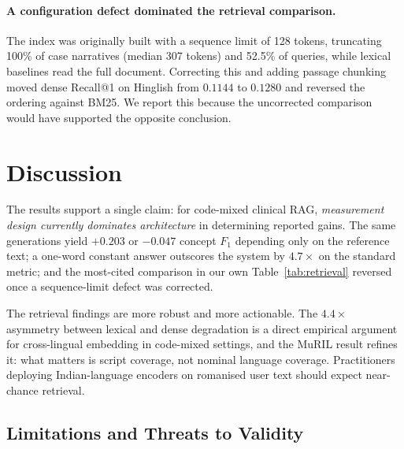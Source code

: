 \documentclass[pdflatex,sn-mathphys-num]{sn-jnl}
\theoremstyle{thmstyleone}
\theoremstyle{thmstyletwo}
\theoremstyle{thmstylethree}
\begin{document}
\paragraph{A configuration defect dominated the retrieval comparison.} The index was
originally built with a sequence limit of 128 tokens, truncating 100\% of case
narratives (median 307 tokens) and 52.5\% of queries, while lexical baselines read the
full document. Correcting this and adding passage chunking moved dense Recall@1 on
Hinglish from $0.1144$ to $0.1280$ and reversed the ordering against BM25. We report
this because the uncorrected comparison would have supported the opposite conclusion.

\section{Discussion}\label{sec:discussion}

The results support a single claim: for code-mixed clinical RAG, \emph{measurement
design currently dominates architecture} in determining reported gains. The same
generations yield $+0.203$ or $-0.047$ concept $F_1$ depending only on the reference
text; a one-word constant answer outscores the system by $4.7\times$ on the standard
metric; and the most-cited comparison in our own Table~\ref{tab:retrieval} reversed once
a sequence-limit defect was corrected.

The retrieval findings are more robust and more actionable. The $4.4\times$ asymmetry
between lexical and dense degradation is a direct empirical argument for cross-lingual
embedding in code-mixed settings, and the MuRIL result refines it: what matters is
script coverage, not nominal language coverage. Practitioners deploying
Indian-language encoders on romanised user text should expect near-chance retrieval.

\subsection{Limitations and Threats to Validity}\label{subsec:limitations}
\end{document}
